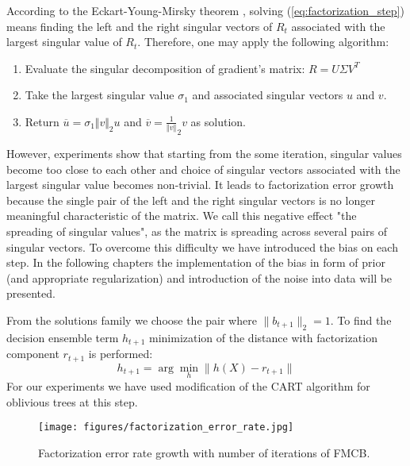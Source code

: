 \documentclass{article}
\begin{document}
According to the Eckart-Young-Mirsky theorem \cite{Eckart1936}, solving (\ref{eq:factorization_step}) means finding the left and the right singular vectors of $R_t$ associated with the largest singular value of $R_t$. Therefore, one may apply the following algorithm: 
\begin{enumerate}
	\item Evaluate the singular decomposition of gradient's matrix: $R = U \Sigma V^T$
	\item Take the largest singular value $\sigma_{1}$ and associated singular vectors $u$ and $v$.
	\item Return $\overline{u}={\sigma_{1}}{\Vert v \Vert}_{2}u$ and $\overline{v}=\frac{1}{\Vert v \Vert}_{2}v$ as solution.
\end{enumerate}
However, experiments show that starting from the some iteration, singular values become too close to each other and choice of singular vectors associated with the largest singular value becomes non-trivial. It leads to factorization error growth because the single pair of the left and the right singular vectors is no longer meaningful characteristic of the matrix. We call this negative effect "the spreading of singular values", as the matrix is spreading across several pairs of singular vectors. To overcome this difficulty we have introduced the bias on each step. In the following chapters the implementation of the bias in form of prior (and appropriate regularization) and introduction of the noise into data will be presented.

From the solutions family we choose the pair where $\|b_{t+1}\|_2 = 1$. To find the decision ensemble term $h_{t+1}$ minimization of the distance with factorization component $r_{t+1}$ is performed:
\begin{equation}
h_{t+1}	= \arg \min_{h} \|h(X) - r_{t+1}\|
\label{eq:minimization_step}
\end{equation}
For our experiments we have used modification of the CART algorithm for oblivious trees \cite{Gulin_winningthe} at this step.

\begin{figure}
\vskip 0.2in
\begin{center}
\centerline{\texttt{[image: figures/factorization\_error\_rate.jpg]}}
\caption{Factorization error rate growth with number of iterations of FMCB.}
\end{center}
\label{fig:factorization-effectiveness}
\vskip -0.2in
\end{figure}
\end{document}
